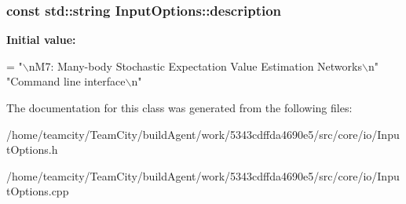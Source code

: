 \subsubsection[{\texorpdfstring{description}{description}}]{\setlength{\rightskip}{0pt plus 5cm}const std\+::string Input\+Options\+::description\hspace{0.3cm}{\ttfamily [static]}}\hypertarget{classInputOptions_a30ba494bd9097575389cc5133f33c5f6}{}\label{classInputOptions_a30ba494bd9097575389cc5133f33c5f6}
{\bfseries Initial value\+:}
\begin{DoxyCode}
=
        \textcolor{stringliteral}{"\(\backslash\)nM7: Many-body Stochastic Expectation Value Estimation Networks\(\backslash\)n"}
        \textcolor{stringliteral}{"Command line interface\(\backslash\)n"}
\end{DoxyCode}


The documentation for this class was generated from the following files\+:\begin{DoxyCompactItemize}
\item 
/home/teamcity/\+Team\+City/build\+Agent/work/5343cdffda4690e5/src/core/io/Input\+Options.\+h\item 
/home/teamcity/\+Team\+City/build\+Agent/work/5343cdffda4690e5/src/core/io/Input\+Options.\+cpp\end{DoxyCompactItemize}
